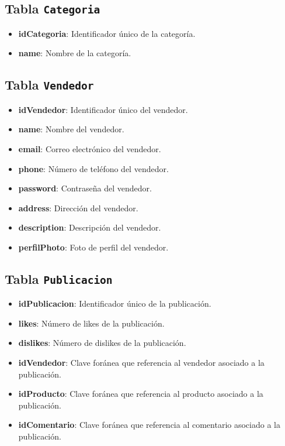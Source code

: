 \documentclass{article}
\begin{document}
\begin{itemize}
\subsection*{Tabla \texttt{Categoria}}
\begin{itemize}[leftmargin=*]
    \item \textbf{idCategoria}: Identificador único de la categoría.
    \item \textbf{name}: Nombre de la categoría.
\end{itemize}

\subsection*{Tabla \texttt{Vendedor}}
\begin{itemize}[leftmargin=*]
    \item \textbf{idVendedor}: Identificador único del vendedor.
    \item \textbf{name}: Nombre del vendedor.
    \item \textbf{email}: Correo electrónico del vendedor.
    \item \textbf{phone}: Número de teléfono del vendedor.
    \item \textbf{password}: Contraseña del vendedor.
    \item \textbf{address}: Dirección del vendedor.
    \item \textbf{description}: Descripción del vendedor.
    \item \textbf{perfilPhoto}: Foto de perfil del vendedor.
\end{itemize}

\subsection*{Tabla \texttt{Publicacion}}
\begin{itemize}[leftmargin=*]
    \item \textbf{idPublicacion}: Identificador único de la publicación.
    \item \textbf{likes}: Número de likes de la publicación.
    \item \textbf{dislikes}: Número de dislikes de la publicación.
    \item \textbf{idVendedor}: Clave foránea que referencia al vendedor asociado a la publicación.
    \item \textbf{idProducto}: Clave foránea que referencia al producto asociado a la publicación.
    \item \textbf{idComentario}: Clave foránea que referencia al comentario asociado a la publicación.
\end{itemize}


\end{itemize}
\end{document}
